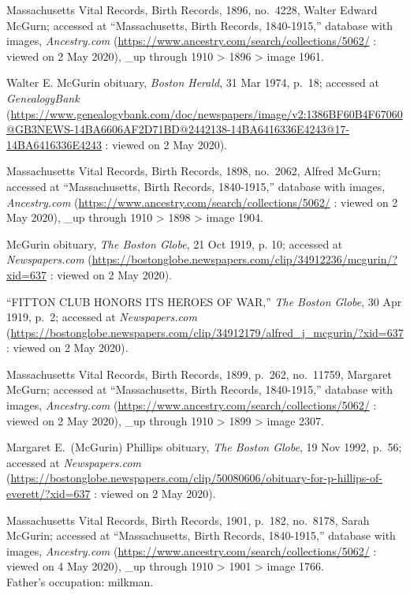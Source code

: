 \begin{thebibliography}{999}
	Massachusetts Vital Records, Birth Records, 1896, no.\ 4228, Walter Edward McGurn; accessed at ``Massachusetts, Birth Records, 1840-1915,'' database with images, \textit{Ancestry.com} (\url{https://www.ancestry.com/search/collections/5062/} : viewed on 2 May 2020), \_up through 1910 > 1896 > image 1961.
	
	Walter E. McGurin obituary, \textit{Boston Herald}, 31 Mar 1974, p.\ 18; accessed at \textit{GenealogyBank} (\url{https://www.genealogybank.com/doc/newspapers/image/v2:1386BF60B4F67060@GB3NEWS-14BA6606AF2D71BD@2442138-14BA6416336E4243@17-14BA6416336E4243} : viewed on 2 May 2020).
	
	Massachusetts Vital Records, Birth Records, 1898, no.\ 2062, Alfred McGurn; accessed at ``Massachusetts, Birth Records, 1840-1915,'' database with images, \textit{Ancestry.com} (\url{https://www.ancestry.com/search/collections/5062/} : viewed on 2 May 2020), \_up through 1910 > 1898 > image 1904.
	
	McGurin obituary, \textit{The Boston Globe}, 21 Oct 1919, p. 10; accessed at \textit{Newspapers.com} (\url{https://bostonglobe.newspapers.com/clip/34912236/mcgurin/?xid=637} : viewed on 2 May 2020).	
	
	``FITTON CLUB HONORS ITS HEROES OF WAR,'' \textit{The Boston Globe}, 30 Apr 1919, p.\ 2; accessed at \textit{Newspapers.com} (\url{https://bostonglobe.newspapers.com/clip/34912179/alfred_j_mcgurin/?xid=637} : viewed on 2 May 2020).
	
	Massachusetts Vital Records, Birth Records, 1899, p.\ 262, no.\ 11759, Margaret McGurn; accessed at ``Massachusetts, Birth Records, 1840-1915,'' database with images, \textit{Ancestry.com} (\url{https://www.ancestry.com/search/collections/5062/} : viewed on 2 May 2020), \_up through 1910 > 1899 > image 2307.
	
	Margaret E.\ (McGurin) Phillips obituary, \textit{The Boston Globe}, 19 Nov 1992, p.\ 56; accessed at \textit{Newspapers.com} 
	(\url{https://bostonglobe.newspapers.com/clip/50080606/obituary-for-p-hillips-of-everett/?xid=637} : viewed on 2 May 2020).
	
	Massachusetts Vital Records, Birth Records, 1901, p.\ 182, no.\ 8178, Sarah McGurin; accessed at ``Massachusetts, Birth Records, 1840-1915,'' database with images, \textit{Ancestry.com} (\url{https://www.ancestry.com/search/collections/5062/} : viewed on 4 May 2020), \_up through 1910 > 1901 > image 1766.\\
	Father's occupation: milkman.
	

\end{thebibliography}
